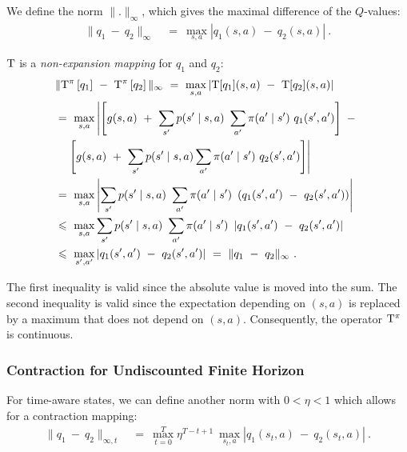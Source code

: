 \documentclass{article}
\renewcommand{\leq}{\leqslant}
\begin{document}
\begin{appendices}
We define the norm $\| . \|_{\infty}$, which gives the maximal difference of
the $Q$-values:
\begin{align}
  \| q_1 \ - \ q_2 \|_{\infty} \ &= \
  \underset{s,a}{\max}
  \left| q_1(s,a) \ - \  q_2(s,a) \right| \ .
\end{align}

$\mathrm{T}$ is a {\em non-expansion mapping} for $q_1$ and $q_2$:
\begin{align}
  &\| \rT^\pi \left[ q_1\right]  \ - \  \rT^\pi \left[ q_2\right] \|_{\infty} \ = \
  \underset{s,a}{\max}
  \left| \rT[q_1](s,a) \ - \  \rT[q_2](s,a) \right| \\ \nonumber
  &= \ \underset{s,a}{\max}
  \left| \left[ g(s,a) \ + \
  \sum_{s'} p(s'\mid s,a) \ 
   \sum_{a'} \pi(a' \mid s') \ q_1(s',a')  \right]
  \ - \ \right.  \\ \nonumber
  & \ \ \ \left. \left[ g(s,a) \ + \ \sum_{s'} p(s'\mid s,a) \sum_{a'} \pi(a' \mid
    s') \ q_2(s',a')   \right]  
  \right|  \\ \nonumber
  &= \ \underset{s,a}{\max}
  \left|
  \sum_{s'} p(s'\mid s,a) \ 
  \sum_{a'} \pi(a' \mid s') \ \left( q_1(s',a')  \ - \ q_2(s',a') \right)
  \right|  \\ \nonumber
  &\leq \ \underset{s,a}{\max}
  \sum_{s'} p(s'\mid s,a) \ 
  \sum_{a'} \pi(a' \mid s') \ \left|q_1(s',a')  \ - \ q_2(s',a') \right|
  \\ \nonumber 
  &\leq \ \underset{s',a'}{\max}
  \left|q_1(s',a')  \ - \ q_2(s',a') \right| \ = \ \| q_1 \ - \ q_2
  \|_{\infty} \ .
\end{align} 

The first inequality is valid since
the absolute value is moved into the sum.
The second inequality is valid since
the expectation depending on $(s,a)$ is replaced by a maximum that
does not depend on $(s,a)$.
Consequently, the operator $\mathrm{T}^\pi$ is continuous.



\subsubsection{Contraction for Undiscounted Finite Horizon}
\label{sec:ApropPolyCon}

For time-aware states, we can define another norm with
$0<\eta<1$ which
allows for a contraction mapping:
\begin{align}
  \| q_1 \ - \ q_2 \|_{\infty,t} \ &= \
  \max_{t=0}^{T} \eta^{T-t+1} \
 \underset{s_t,a}{\max}
 \left| q_1(s_t,a) \ - \  q_2(s_t,a) \right| \ .
\end{align}



\end{appendices}
\end{document}
